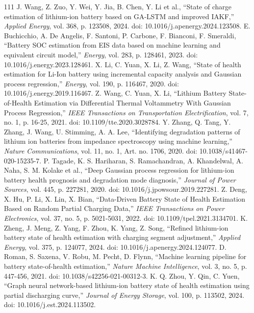 \documentclass[journal]{IEEEtran}
\begin{document}
\begin{thebibliography}{111}
J. Wang, Z. Zuo, Y. Wei, Y. Jia, B. Chen, Y. Li et al., ``State of charge estimation of lithium-ion battery based on GA-LSTM and improved IAKF,'' \emph{Applied Energy}, vol. 368, p. 123508, 2024. doi: 10.1016/j.apenergy.2024.123508.
E. Buchicchio, A. De Angelis, F. Santoni, P. Carbone, F. Bianconi, F. Smeraldi, ``Battery SOC estimation from EIS data based on machine learning and equivalent circuit model,'' \emph{Energy}, vol. 283, p. 128461, 2023. doi: 10.1016/j.energy.2023.128461.
X. Li, C. Yuan, X. Li, Z. Wang, ``State of health estimation for Li-Ion battery using incremental capacity analysis and Gaussian process regression,'' \emph{Energy}, vol. 190, p. 116467, 2020. doi: 10.1016/j.energy.2019.116467.
Z. Wang, C. Yuan, X. Li, ``Lithium Battery State-of-Health Estimation via Differential Thermal Voltammetry With Gaussian Process Regression,'' \emph{IEEE Transactions on Transportation Electrification}, vol. 7, no. 1, p. 16-25, 2021. doi: 10.1109/tte.2020.3028784.
Y. Zhang, Q. Tang, Y. Zhang, J. Wang, U. Stimming, A. A. Lee, ``Identifying degradation patterns of lithium ion batteries from impedance spectroscopy using machine learning,'' \emph{Nature Communications}, vol. 11, no. 1, Art. no. 1706, 2020. doi: 10.1038/s41467-020-15235-7.
P. Tagade, K. S. Hariharan, S. Ramachandran, A. Khandelwal, A. Naha, S. M. Kolake et al., ``Deep Gaussian process regression for lithium-ion battery health prognosis and degradation mode diagnosis,'' \emph{Journal of Power Sources}, vol. 445, p. 227281, 2020. doi: 10.1016/j.jpowsour.2019.227281.
Z. Deng, X. Hu, P. Li, X. Lin, X. Bian, ``Data-Driven Battery State of Health Estimation Based on Random Partial Charging Data,'' \emph{IEEE Transactions on Power Electronics}, vol. 37, no. 5, p. 5021-5031, 2022. doi: 10.1109/tpel.2021.3134701.
K. Zheng, J. Meng, Z. Yang, F. Zhou, K. Yang, Z. Song, ``Refined lithium-ion battery state of health estimation with charging segment adjustment,'' \emph{Applied Energy}, vol. 375, p. 124077, 2024. doi: 10.1016/j.apenergy.2024.124077.
D. Roman, S. Saxena, V. Robu, M. Pecht, D. Flynn, ``Machine learning pipeline for battery state-of-health estimation,'' \emph{Nature Machine Intelligence}, vol. 3, no. 5, p. 447-456, 2021. doi: 10.1038/s42256-021-00312-3.
K. Q. Zhou, Y. Qin, C. Yuen, ``Graph neural network-based lithium-ion battery state of health estimation using partial discharging curve,'' \emph{Journal of Energy Storage}, vol. 100, p. 113502, 2024. doi: 10.1016/j.est.2024.113502.

\end{thebibliography}
\end{document}
